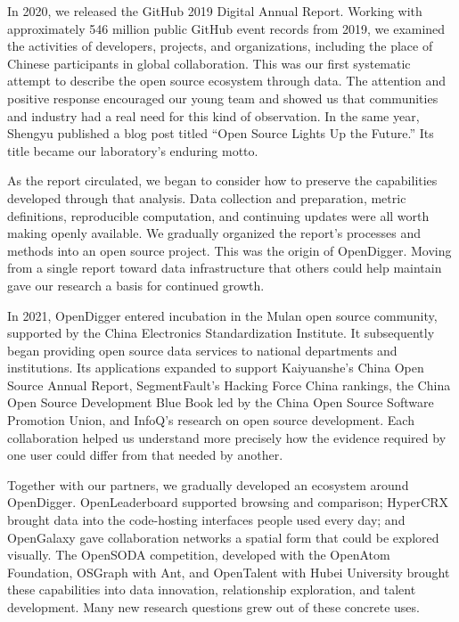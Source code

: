 In 2020, we released the GitHub 2019 Digital Annual Report. Working with approximately 546 million public GitHub event records from 2019, we examined the activities of developers, projects, and organizations, including the place of Chinese participants in global collaboration. This was our first systematic attempt to describe the open source ecosystem through data. The attention and positive response encouraged our young team and showed us that communities and industry had a real need for this kind of observation. In the same year, Shengyu published a blog post titled “Open Source Lights Up the Future.” Its title became our laboratory’s enduring motto.

As the report circulated, we began to consider how to preserve the capabilities developed through that analysis. Data collection and preparation, metric definitions, reproducible computation, and continuing updates were all worth making openly available. We gradually organized the report's processes and methods into an open source project. This was the origin of OpenDigger. Moving from a single report toward data infrastructure that others could help maintain gave our research a basis for continued growth.

In 2021, OpenDigger entered incubation in the Mulan open source community, supported by the China Electronics Standardization Institute. It subsequently began providing open source data services to national departments and institutions. Its applications expanded to support Kaiyuanshe's China Open Source Annual Report, SegmentFault's Hacking Force China rankings, the China Open Source Development Blue Book led by the China Open Source Software Promotion Union, and InfoQ's research on open source development. Each collaboration helped us understand more precisely how the evidence required by one user could differ from that needed by another.

Together with our partners, we gradually developed an ecosystem around OpenDigger. OpenLeaderboard supported browsing and comparison; HyperCRX brought data into the code-hosting interfaces people used every day; and OpenGalaxy gave collaboration networks a spatial form that could be explored visually. The OpenSODA competition, developed with the OpenAtom Foundation, OSGraph with Ant, and OpenTalent with Hubei University brought these capabilities into data innovation, relationship exploration, and talent development. Many new research questions grew out of these concrete uses.

